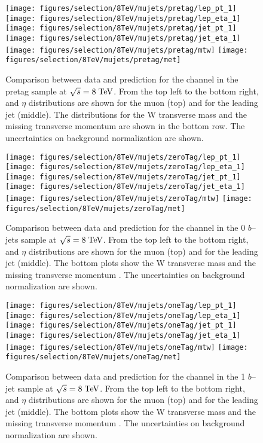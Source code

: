 \begin{figure}
  \centering
  \texttt{[image: figures/selection/8TeV/mujets/pretag/lep\_pt\_1]}
  \texttt{[image: figures/selection/8TeV/mujets/pretag/lep\_eta\_1]}
  \texttt{[image: figures/selection/8TeV/mujets/pretag/jet\_pt\_1]}
  \texttt{[image: figures/selection/8TeV/mujets/pretag/jet\_eta\_1]}
  \texttt{[image: figures/selection/8TeV/mujets/pretag/mtw]}
  \texttt{[image: figures/selection/8TeV/mujets/pretag/met]}
  \caption{Comparison between data and prediction for the \mujets{} channel in the pretag
    sample at $\sqrt{s} = 8 \; \mathrm{TeV}{}$.  From the top left to the bottom
    right, \pt{} and $\eta$ distributions are shown for the
    muon (top) and for the leading jet (middle).  The distributions
    for the W transverse mass \mtw{} and the missing transverse
    momentum \met{} are shown in the bottom row. 
    The uncertainties on background normalization are shown.
  }
  \label{fig:2012mu_pretag}
\end{figure}
%
\begin{figure}
  \centering
  \texttt{[image: figures/selection/8TeV/mujets/zeroTag/lep\_pt\_1]}
  \texttt{[image: figures/selection/8TeV/mujets/zeroTag/lep\_eta\_1]}
  \texttt{[image: figures/selection/8TeV/mujets/zeroTag/jet\_pt\_1]}
  \texttt{[image: figures/selection/8TeV/mujets/zeroTag/jet\_eta\_1]}
  \texttt{[image: figures/selection/8TeV/mujets/zeroTag/mtw]}
  \texttt{[image: figures/selection/8TeV/mujets/zeroTag/met]}
  \caption{Comparison between data and prediction for the \mujets{}
    channel in the 0 $b$--jets sample at $\sqrt{s} = 8 \; \mathrm{TeV}{}$.  From
    the top left to the bottom right, \pt{} and $\eta$ distributions are shown for the
    muon (top) and for the leading jet (middle). The bottom plots show
    the W transverse mass \mtw{} and the missing transverse
    momentum \met{}. 
    The uncertainties on background normalization are shown.
  }
  \label{fig:2012mu_0tag}
\end{figure}
%
\begin{figure}
  \centering
  \texttt{[image: figures/selection/8TeV/mujets/oneTag/lep\_pt\_1]}
  \texttt{[image: figures/selection/8TeV/mujets/oneTag/lep\_eta\_1]}
  \texttt{[image: figures/selection/8TeV/mujets/oneTag/jet\_pt\_1]}
  \texttt{[image: figures/selection/8TeV/mujets/oneTag/jet\_eta\_1]}
  \texttt{[image: figures/selection/8TeV/mujets/oneTag/mtw]}
  \texttt{[image: figures/selection/8TeV/mujets/oneTag/met]}
  \caption{Comparison between data and prediction for the \mujets{}
    channel in the 1 $b$--jet sample at $\sqrt{s} = 8 \; \mathrm{TeV}{}$.  From
    the top left to the bottom right, \pt{} and $\eta$ distributions are shown for the
    muon (top) and for the leading jet (middle). The bottom plots show
    the W transverse mass \mtw{} and the missing transverse
    momentum \met{}. 
    The uncertainties on background normalization are shown.
  }
  \label{fig:2012mu_1tag}
\end{figure}
